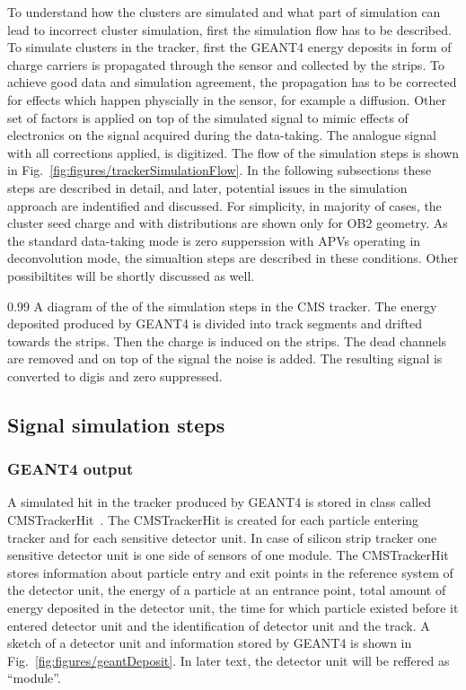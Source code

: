 To understand how the clusters are simulated and what part of simulation can lead to incorrect cluster simulation, first the simulation flow has to be described. To simulate clusters in the tracker, first the GEANT4 energy deposits in form of charge carriers is propagated through the sensor and collected by the strips. To achieve good data and simulation agreement, the propagation has to be corrected for effects which happen physcially in the sensor, for example a diffusion. Other set of factors is applied on top of the simulated signal to mimic effects of electronics on the signal acquired during the data-taking. The analogue signal with all corrections applied, is digitized. The flow of the simulation steps is shown in Fig.~\ref{fig:figures/trackerSimulationFlow}. In the following subsections these steps are described in detail, and later, potential issues in the simulation approach are indentified and discussed. For simplicity, in majority of cases, the cluster seed charge and with distributions are shown only for OB2 geometry. As the standard data-taking mode is zero supperssion with APVs operating in deconvolution mode, the simualtion steps are described in these conditions. Other possibiltites will be shortly discussed as well.

                 {0.99}       %
                 { A diagram of the of the simulation steps in the CMS tracker. The energy deposited produced by GEANT4 is divided into track segments and drifted towards the strips. Then the charge is induced on the strips. The dead channels are removed and on top of the signal the noise is added. The resulting signal is converted to digis and zero suppressed. }

\subsection{Signal simulation steps}


\subsubsection{GEANT4 output}

A simulated hit in the tracker produced by GEANT4 is stored in class called CMSTrackerHit~\cite{Lefebure:1364020}. The CMSTrackerHit is created for each particle entering tracker and for each sensitive detector unit. In case of silicon strip tracker one sensitive detector unit is one side of sensors of one module. The CMSTrackerHit stores information about particle entry and exit points in the reference system of the detector unit, the energy of a particle at an entrance point, total amount of energy deposited in the detector unit, the time for which particle existed before it entered detector unit and the identification of detector unit and the track. A sketch of a detector unit and information stored by GEANT4 is shown in Fig.~\ref{fig:figures/geantDeposit}. In later text, the detector unit will be reffered as ``module''.

